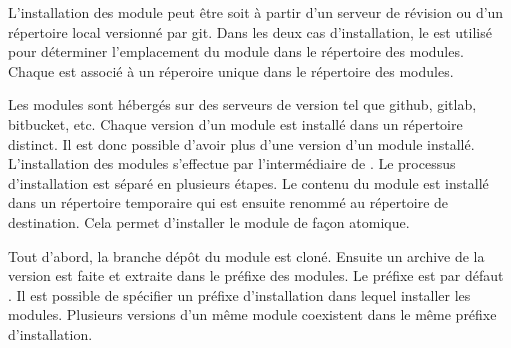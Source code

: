 L'installation des module peut être soit à partir d'un serveur de révision
ou d'un répertoire local versionné par git. Dans les deux cas d'installation,
le   est utilisé pour déterminer l'emplacement du module
dans le répertoire des modules. Chaque  est associé à un
réperoire unique dans le répertoire des modules.







Les modules sont hébergés sur des serveurs de version tel que github, gitlab,
bitbucket, etc. Chaque version d'un module est installé dans un répertoire
distinct. Il est donc possible d'avoir plus d'une version d'un module installé.
L'installation des modules s'effectue par l'intermédiaire de
. Le processus d'installation est séparé en plusieurs étapes.  Le
contenu du module est installé dans un répertoire temporaire qui est ensuite
renommé au répertoire de destination. Cela permet d'installer le module de
façon atomique.

Tout d'abord, la
branche  dépôt du module est cloné. Ensuite un archive de la
version est faite et extraite dans le préfixe des modules. Le préfixe est par
défaut .  Il est possible de spécifier un préfixe
d'installation dans lequel installer les modules. Plusieurs versions d'un même
module coexistent dans le même préfixe d'installation.

